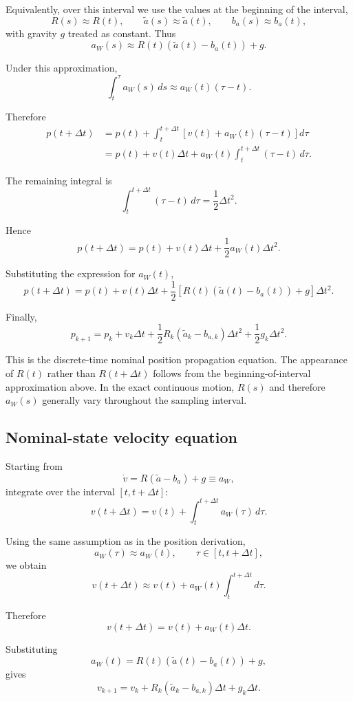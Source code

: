 \documentclass[11pt]{article}
\numberwithin{equation}{section}
\begin{document}
Equivalently, over this interval we use the values at the beginning of
the interval,
\[
R(s)\approx R(t),
\qquad
\tilde a(s)\approx\tilde a(t),
\qquad
b_a(s)\approx b_a(t),
\]
with gravity $g$ treated as constant. Thus
\[
a_W(s)
\approx
R(t)(\tilde a(t)-b_a(t))+g.
\]

Under this approximation,
\[
\int_t^\tau a_W(s)\,ds
\approx
a_W(t)(\tau-t).
\]

Therefore
\begin{align}
p(t+\Delta t)
&=
p(t)+
\int_t^{t+\Delta t}
\left[
v(t)+a_W(t)(\tau-t)
\right]d\tau\\
&=
p(t)
+
v(t)\Delta t
+
a_W(t)
\int_t^{t+\Delta t}(\tau-t)\,d\tau.
\end{align}

The remaining integral is
\[
\int_t^{t+\Delta t}(\tau-t)\,d\tau
=
\frac12\Delta t^2.
\]

Hence
\[
p(t+\Delta t)
=
p(t)+v(t)\Delta t
+\frac12a_W(t)\Delta t^2.
\]

Substituting the expression for $a_W(t)$,
\[
p(t+\Delta t)
=
p(t)+v(t)\Delta t
+
\frac12
\left[
R(t)(\tilde a(t)-b_a(t))+g
\right]
\Delta t^2.
\]

Finally,
\begin{equation}
\boxed{
p_{k+1}
=
p_k+v_k\Delta t
+
\frac12R_k(\tilde a_k-b_{a,k})\Delta t^2
+
\frac12g_k\Delta t^2.
}
\end{equation}

This is the discrete-time nominal position propagation equation.  The
appearance of $R(t)$ rather than $R(t+\Delta t)$ follows from the
beginning-of-interval approximation above.  In the exact continuous
motion, $R(s)$ and therefore $a_W(s)$ generally vary throughout the
sampling interval.

\subsection{Nominal-state velocity equation}

Starting from
\[
\dot v
=
R(\tilde a-b_a)+g
\equiv
a_W,
\]
integrate over the interval $[t,t+\Delta t]$:
\[
v(t+\Delta t)
=
v(t)
+
\int_t^{t+\Delta t}
a_W(\tau)\,d\tau.
\]

Using the same assumption as in the position derivation,
\[
a_W(\tau)\approx a_W(t),
\qquad
\tau\in[t,t+\Delta t],
\]
we obtain
\[
v(t+\Delta t)
\approx
v(t)
+
a_W(t)
\int_t^{t+\Delta t}d\tau.
\]

Therefore
\[
v(t+\Delta t)
=
v(t)
+
a_W(t)\Delta t.
\]

Substituting
\[
a_W(t)
=
R(t)(\tilde a(t)-b_a(t))+g,
\]
gives
\begin{equation}
\boxed{
v_{k+1}
=
v_k
+
R_k(\tilde a_k-b_{a,k})\Delta t
+
g_k\Delta t.
}
\end{equation}
\end{document}
